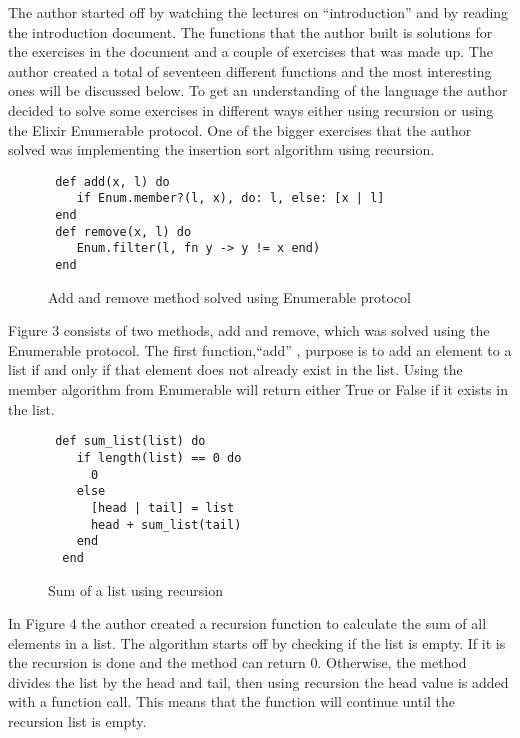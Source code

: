 \documentclass[a4paper,11pt]{article}
\begin{document}
The author started off by watching the lectures on “introduction” and by reading the introduction document. The functions that the author built is solutions for the exercises in the document and a couple of exercises that was made up. The author created a total of seventeen different functions and the most interesting ones will be discussed below. To get an understanding of the language the author decided to solve some exercises in different ways either using recursion or using the Elixir Enumerable protocol. One of the bigger exercises that the author solved was implementing the insertion sort algorithm using recursion.

\begin{figure}[!ht]
\begin{verbatim}
 def add(x, l) do
    if Enum.member?(l, x), do: l, else: [x | l]
 end
 def remove(x, l) do
    Enum.filter(l, fn y -> y != x end)
 end
\end{verbatim}
\caption{Add and remove method solved using Enumerable protocol}
\label{Figure:3}
\end{figure}

Figure 3 consists of two methods, add and remove, which was solved using the Enumerable protocol. The first function,“add” , purpose is to add an element to a list if and only if that element does not already exist in the list. Using the member algorithm from Enumerable will return either True or False if it exists in the list.

\begin{figure}[!ht]
\begin{verbatim}
 def sum_list(list) do
    if length(list) == 0 do
      0
    else
      [head | tail] = list
      head + sum_list(tail)
    end
  end
\end{verbatim}
\caption{Sum of a list using recursion}
\label{Figure:4}
\end{figure}

In Figure 4 the author created a recursion function to calculate the sum of all elements in a list. The algorithm starts off by checking if the list is empty. If it is the recursion is done and the method can return 0. Otherwise, the method divides the list by the head and tail, then using recursion the head value is added with a function call. This means that the function will continue until the recursion list is empty.
\end{document}
